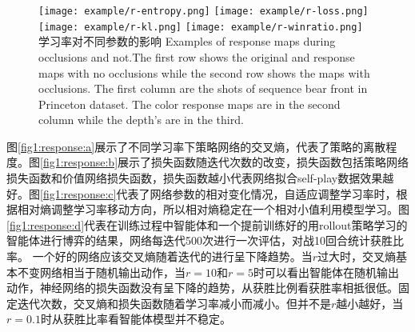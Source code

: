 \begin{figure}[t]
	\centering
	{\texttt{[image: example/r-entropy.png]}}
	\hspace{0.5em}
	{\texttt{[image: example/r-loss.png]}}
	\newline
	\centering
	{\texttt{[image: example/r-kl.png]}}
	\hspace{0.5em}
	{\texttt{[image: example/r-winratio.png]}}
	\bicaption
	{学习率对不同参数的影响}
	{Examples of response maps during occlusions and not.The first row shows the original and response maps with no occlusions while the second row shows the maps with occlusions. The first column are the shots of sequence bear front in Princeton dataset. The color response maps are in the second column while the depth’s are in the third.}
	\label{fig1:response}
\end{figure}
图\ref{fig1:response:a}展示了不同学习率下策略网络的交叉熵，代表了策略的离散程度。图\ref{fig1:response:b}展示了损失函数随迭代次数的改变，损失函数包括策略网络损失函数和价值网络损失函数，损失函数越小代表网络拟合self-play数据效果越好。图\ref{fig1:response:c}代表了网络参数的相对变化情况，自适应调整学习率时，根据相对熵调整学习率移动方向，所以相对熵稳定在一个相对小值利用模型学习。图\ref{fig1:response:d}代表在训练过程中智能体和一个提前训练好的用rollout策略学习的智能体进行博弈的结果，网络每迭代500次进行一次评估，对战10回合统计获胜比率。
一个好的网络应该交叉熵随着迭代的进行呈下降趋势。当$r$过大时，交叉熵基本不变网络相当于随机输出动作，当$r=10$和$r=5$时可以看出智能体在随机输出动作，神经网络的损失函数没有呈下降的趋势，从获胜比例看获胜率相抵很低。固定迭代次数，交叉熵和损失函数随着学习率减小而减小。但并不是$r$越小越好，当$r=0.1$时从获胜比率看智能体模型并不稳定。

